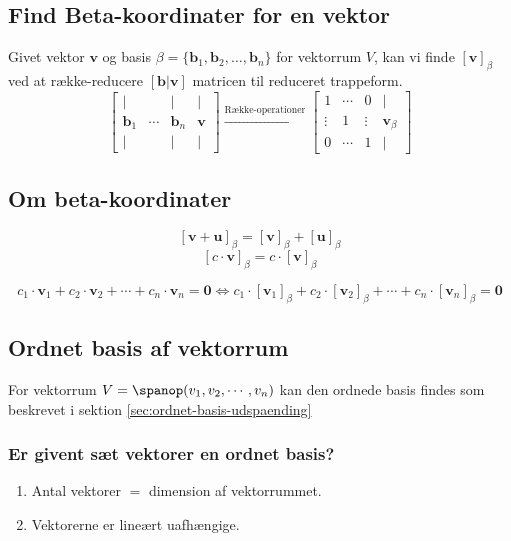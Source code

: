 \subsection{Find Beta-koordinater for en vektor}
\label{sec:beta-koordinater}
Givet vektor $\mathbf{v}$ og basis $\beta = \{\mathbf{b}_1, \mathbf{b}_2, \ldots, \mathbf{b}_n\}$ for vektorrum $V$, kan vi finde $[\mathbf{v}]_\beta$ ved at række-reducere \([\mathbf{b}|\mathbf{v}]\) matricen til reduceret trappeform.
\[
\begin{bmatrix}
    \vert & & \vert & \vert \\
    \mathbf{b}_1 & \cdots & \mathbf{b}_n & \mathbf{v} \\
    \vert & & \vert & \vert
\end{bmatrix}
\xrightarrow{\text{Række-operationer}}
\begin{bmatrix}
    1 & \cdots & 0 & \vert \\
    \vdots & 1 & \vdots & \mathbf{v}_\beta \\
    0 & \cdots & 1 & \vert
\end{bmatrix}
\]

\subsection{Om beta-koordinater}
\[ [\mathbf{v} + \mathbf{u}]_\beta = [\mathbf{v}]_\beta + [\mathbf{u}]_\beta \]
\[ [c \cdot \mathbf{v}]_\beta = c \cdot [\mathbf{v}]_\beta \]

\[ c_1 \cdot \mathbf{v}_1 + c_2 \cdot \mathbf{v}_2 + \cdots + c_n \cdot \mathbf{v}_n = \mathbf{0} \iff c_1 \cdot [\mathbf{v}_1]_\beta + c_2 \cdot [\mathbf{v}_2]_\beta + \cdots + c_n \cdot [\mathbf{v}_n]_\beta = \mathbf{0} \]

\subsection{Ordnet basis af vektorrum}
For vektorrum \(V=\spanop(v_1,v_2,\cdots,v_n)\) kan den ordnede basis findes som beskrevet i sektion \ref{sec:ordnet-basis-udspaending}

\subsubsection{Er givent sæt vektorer en ordnet basis?}
\begin{enumerate}
    \item Antal vektorer $=$ dimension af vektorrummet.
    \item Vektorerne er lineært uafhængige.
\end{enumerate}


